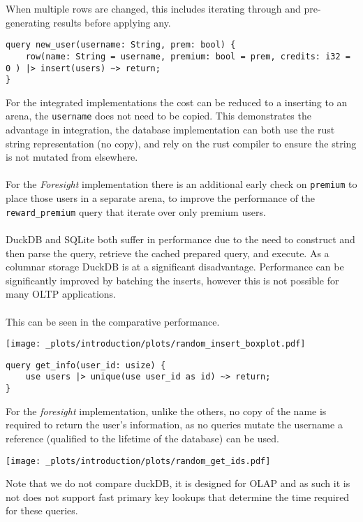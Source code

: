 When multiple rows are changed, this includes iterating through and pre-generating results before applying any.
\begin{verbatim}
query new_user(username: String, prem: bool) {
    row(name: String = username, premium: bool = prem, credits: i32 = 0 ) |> insert(users) ~> return;
}
\end{verbatim}
For the integrated implementations the cost can be reduced to a inserting to an arena, the \texttt{username}
does not need to be copied. This demonstrates the advantage in integration, the database implementation can both use the rust string representation (no copy),
and rely on the rust compiler to ensure the string is not mutated from elsewhere.
\\
\\ For the \textit{Foresight} implementation there is an additional early
check on \texttt{premium} to place those users in a separate arena, to improve the performance
of the \texttt{reward_premium} query that iterate over only premium users.
\\
\\ DuckDB and SQLite both suffer in performance due to the need to construct and then parse the query,
retrieve the cached prepared query, and execute. As a columnar storage DuckDB is at a significant
disadvantage. Performance can be significantly improved by batching the inserts, however this is not possible for many OLTP applications.
\\
\\ This can be seen in the comparative performance.
\begin{center}
    \texttt{[image: \_plots/introduction/plots/random\_insert\_boxplot.pdf]}
\end{center}

\begin{verbatim}
query get_info(user_id: usize) {
    use users |> unique(use user_id as id) ~> return;
}
\end{verbatim}
For the \textit{foresight} implementation, unlike the others, no copy of the name is required to return the user's information, as no queries mutate the username a reference (qualified to the lifetime of the database) can be used.
\begin{center}
    \texttt{[image: \_plots/introduction/plots/random\_get\_ids.pdf]}
\end{center}
Note that we do not compare duckDB, it is designed for OLAP and as such it is not does not support fast primary key lookups that determine the time required for these queries.

